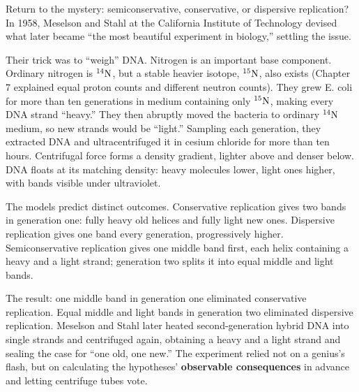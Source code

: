 \begin{zhengju}
Return to the mystery: semiconservative, conservative, or dispersive replication? In 1958, Meselson and Stahl at the California Institute of Technology devised what later became ``the most beautiful experiment in biology,'' settling the issue.

Their trick was to ``weigh'' DNA. Nitrogen is an important base component. Ordinary nitrogen is $\mathrm{^{14}N}$, but a stable heavier isotope, $\mathrm{^{15}N}$, also exists (Chapter 7 explained equal proton counts and different neutron counts). They grew E. coli for more than ten generations in medium containing only $\mathrm{^{15}N}$, making every DNA strand ``heavy.'' They then abruptly moved the bacteria to ordinary $\mathrm{^{14}N}$ medium, so new strands would be ``light.'' Sampling each generation, they extracted DNA and ultracentrifuged it in cesium chloride for more than ten hours. Centrifugal force forms a density gradient, lighter above and denser below. DNA floats at its matching density: heavy molecules lower, light ones higher, with bands visible under ultraviolet.

The models predict distinct outcomes. Conservative replication gives two bands in generation one: fully heavy old helices and fully light new ones. Dispersive replication gives one band every generation, progressively higher. Semiconservative replication gives one middle band first, each helix containing a heavy and a light strand; generation two splits it into equal middle and light bands.

The result: one middle band in generation one eliminated conservative replication. Equal middle and light bands in generation two eliminated dispersive replication. Meselson and Stahl later heated second-generation hybrid DNA into single strands and centrifuged again, obtaining a heavy and a light strand and sealing the case for ``one old, one new.'' The experiment relied not on a genius's flash, but on calculating the hypotheses' \textbf{observable consequences} in advance and letting centrifuge tubes vote.
\end{zhengju}


